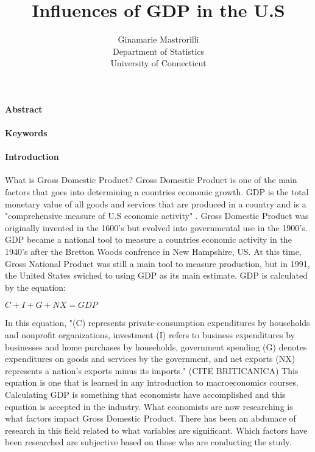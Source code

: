 \documentclass[12pt]{article}
\title{Influences of GDP in the U.S }
\author{Ginamarie Mastrorilli\\
  Department of Statistics\\
  University of Connecticut
}
\begin{document}
\maketitle


\paragraph{Abstract}


\paragraph{Keywords}



\paragraph{Introduction}



  What is Gross Domestic Product? Gross Domestic Product is one of the main factors that goes into determining a countries economic growth. 
GDP is the total monetary value of all goods and services that are produced in a country and is a "comprehensive measure of U.S economic activity" \citet[]{bea}.
Gross Domestic Product was originally invented in the 1600's but evolved into governmental use in the 1900's. 
GDP became a national tool to measure a countries economic activity in the 1940's after the Bretton Woods confrence in New Hampshire, US.
At this time, Gross National Product was still a main tool to measure production, but in 1991, the United States swiched to using GDP as its main estimate. 
GDP is calculated by the equation: 

$C + I + G + NX = GDP$

In this equation, "(C) represents private-consumption expenditures by households and nonprofit organizations, investment (I) refers to business expenditures by businesses and home purchases by households, 
government spending (G) denotes expenditures on goods and services by the government, and net exports (NX) represents a nation’s exports minus its imports." (CITE BRITICANICA)
This equation is one that is learned in any introduction to macroeconomics courses. 
Calculating GDP is something that economists have accomplished and this equation is accepted in the industry. 
What economists are now researching is what factors impact Gross Domestic Product. 
There has been an abdunace of research in this field related to what variables are significant. 
Which factors have been researched are subjective based on those who are conducting the study.
\end{document}
